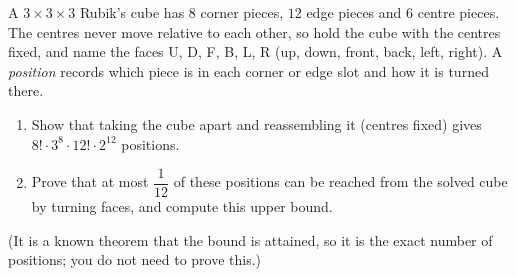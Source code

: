 A $3\times3\times3$ Rubik's cube has $8$ corner pieces, $12$ edge pieces and $6$ centre pieces. The centres never move relative to each other, so hold the cube with the centres fixed, and name the faces U, D, F, B, L, R (up, down, front, back, left, right). A \emph{position} records which piece is in each corner or edge slot and how it is turned there.
\begin{enumerate}
\item[(a)] Show that taking the cube apart and reassembling it (centres fixed) gives $8!\cdot3^8\cdot12!\cdot2^{12}$ positions.
\item[(b)] Prove that at most $\dfrac1{12}$ of these positions can be reached from the solved cube by turning faces, and compute this upper bound.
\end{enumerate}
(It is a known theorem that the bound is attained, so it is the exact number of positions; you do not need to prove this.)
